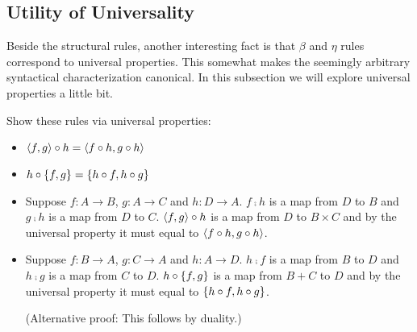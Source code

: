 \documentclass[12pt]{article}
\newcommand{\cut}[1]{}
\newcommand{\showsol}[1]{\color{FireBrick}#1\normalcolor}%
\newcommand{\showsol}[1]{\cut{#1}}%
\newenvironment{sol}{\trivlist \item[\hskip \labelsep{\bf
Solution:}]}{\endtrivlist}
\begin{document}
\subsection{Utility of Universality}

Beside the structural rules, another interesting fact is that
$\beta$ and $\eta$ rules correspond to universal properties.
This somewhat makes the seemingly arbitrary syntactical characterization canonical.
In this subsection we will explore universal properties a little bit.

\begin{task}
  Show these rules via universal properties:
  \begin{itemize}
    \item $\langle f,g\rangle \mathbin{\circ} h = \langle f\mathbin{\circ} h,g\mathbin{\circ} h\rangle$
    \item $h \mathbin{\circ} \{ f,g\} = \{ h\mathbin{\circ} f,h\mathbin{\circ} g\}$
  \end{itemize}
\end{task}

\showsol{
  \begin{sol}\mbox{}
    \begin{itemize}
      \item
        Suppose $f : A \to B$, $g : A \to C$ and $h : D \to A$.
        $f\comp h$ is a map from $D$ to $B$
        and
        $g\comp h$ is a map from $D$ to $C$.
        $\langle f,g\rangle \mathbin{\circ} h$ is a map from $D$ to $B \times C$
        and by the universal property it must equal to $\langle f\mathbin{\circ} h,g\mathbin{\circ} h\rangle$.
      \item
        Suppose $f : B \to A$, $g : C \to A$ and $h : A \to D$.
        $h\comp f$ is a map from $B$ to $D$
        and
        $h\comp g$ is a map from $C$ to $D$.
        $h\mathbin{\circ}\{ f,g\}$ is a map from $B + C$ to $D$
        and by the universal property it must equal to $\{ h\mathbin{\circ} f,h\mathbin{\circ} g\}$.

        (Alternative proof: This follows by duality.)
    \end{itemize}
  \end{sol}
}
\end{document}
